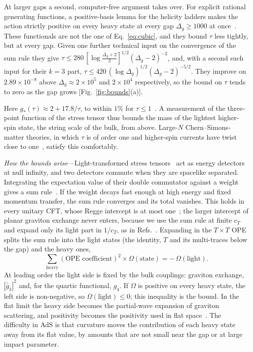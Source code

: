 \documentclass[aps,prl,twocolumn,superscriptaddress,nofootinbib,floatfix]{revtex4-2}
\begin{document}
At larger gaps a second, computer-free argument takes over. For explicit rational generating functions, a positive-basis lemma
for the helicity ladders makes the action strictly positive on every heavy state at every gap $\Delta_g\ge1000$ at once~\cite{SM}.
These functionals are not the one of Eq.~\eqref{eq:cubic}, and they bound $\tau$ less tightly, but at every gap. Given one further
technical input on the convergence of the sum rule they give $\tau\le280\,[\log\frac{\Delta_g+2}3]^{1/2}(\Delta_g-2)^{-2}$, and, with a
second such input for their $k=3$ part, $\tau\le420\,(\log\Delta_g)^{1/2}(\Delta_g-2)^{-5/2}$. They improve on
$2.89\times10^{-8}$ above $\Delta_g\approx2\times10^5$ and $2\times10^4$ respectively, so the bound on $\tau$ tends to zero as the gap grows
[Fig.~\ref{fig:bounds}(a)].

Here $g_*(\tau)\approx2+17.8/\tau$, to within $1\%$ for $\tau\le1$~\cite{SM}. A measurement of the three-point function of the
stress tensor thus bounds the mass of the lightest higher-spin state, the string scale of the bulk, from above. Large-$N$
Chern--Simons-matter theories, in which $\tau$ is of order one and higher-spin currents have twist close to one~\cite{GPY},
satisfy this comfortably.

\textit{How the bounds arise}---Light-transformed stress tensors~\cite{KSDlight} act as energy detectors at
null infinity, and two detectors commute when they are spacelike separated. Integrating the expectation
value of their double commutator against a weight gives a sum rule~\cite{KKSDZ,CLSD}. If the weight decays
fast enough at high energy and fixed momentum transfer, the sum rule converges and its total vanishes. This
holds in every unitary CFT, whose Regge intercept is at most one~\cite{KKSDZ,CaronHuotInversion,PSZ}; the
larger intercept of planar graviton exchange never enters, because we use the sum rule at finite $c_T$ and
expand only its light part in $1/c_T$, as in Refs.~\cite{CHMRS,CLSD}. Expanding in the $T\times T$ OPE
splits the sum rule into the light states (the identity, $T$ and its multi-traces below the gap) and the
heavy ones,
\begin{equation}
\sum_{\text{heavy}}(\text{OPE coefficient})^2\times\Omega(\text{state})=-\,\Omega(\text{light}).
\label{eq:sumrule}
\end{equation}
At leading order the light side is fixed by the bulk couplings: graviton exchange, $|\hat g_3|^2$ and, for
the quartic functional, $g_4$. If $\Omega$ is positive on every heavy state, the left side is non-negative, so
$\Omega(\text{light})\le0$; this inequality is the bound. In the flat limit the heavy side becomes the partial-wave
expansion of graviton scattering, and positivity becomes the positivity used in flat space~\cite{CHLPS}. The
difficulty in AdS is that curvature moves the contribution of each heavy state away from its flat value, by
amounts that are not small near the gap or at large impact parameter.
\end{document}
